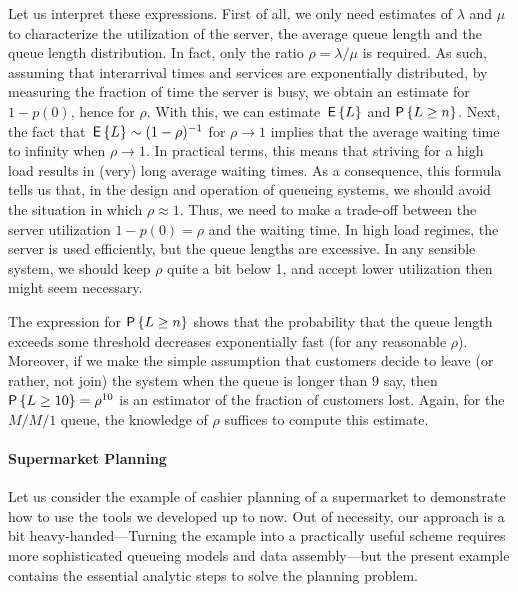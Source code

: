 Let us interpret these expressions. First of all, we only need
estimates of $\lambda$ and $\mu$ to characterize the utilization of
the server, the average queue length and the queue length
distribution. In fact, only the ratio $\rho=\lambda/\mu$ is required.
As such, assuming that interarrival times and services are
exponentially distributed, by measuring the fraction of time the
server is busy, we obtain an estimate for $1-p(0)$, hence for $\rho$.
With this, we can estimate $\,\mathsf{E}\left\{L\right\}$ and $\P{L\geq n}$.  Next, the fact
that $\,\mathsf{E}\left\{L\right\} \sim (1-\rho)^{-1}$ for $\rho\to 1$ implies that the
average waiting time  to
infinity when $\rho\to1$.  In practical terms, this means that
striving for a high load results in (very) long average waiting
times. As a consequence, this formula tells us that, in the design and
operation of queueing systems, we should avoid the situation in which
$\rho\approx 1$. Thus, we need to make a trade-off between the server
utilization $1-p(0) = \rho$ and the waiting time. In high load
regimes, the server is used efficiently, but the queue lengths are
excessive. In any sensible system, we should keep $\rho$ quite a bit
below 1, and accept lower utilization then might seem necessary.

The expression for $\P{L\geq n}$ shows that the probability that the
queue length exceeds some threshold decreases exponentially fast (for
any reasonable $\rho$). Moreover, if we make the simple assumption
that customers decide to leave (or rather, not join) the system when
the queue is longer than $9$ say, then $\P{L\geq 10} = \rho^{10}$ is
an estimator of the fraction of customers lost. Again, for the $M/M/1$
queue, the knowledge of $\rho$ suffices to compute this estimate.


\paragraph{Supermarket Planning}

Let us consider the example of cashier planning of a supermarket to
demonstrate how to use the tools we developed up to now. Out of
necessity, our approach is a bit heavy-handed---Turning the example
into a practically useful scheme requires more sophisticated queueing
models and data assembly---but the present example contains the
essential analytic steps to solve the planning problem.

